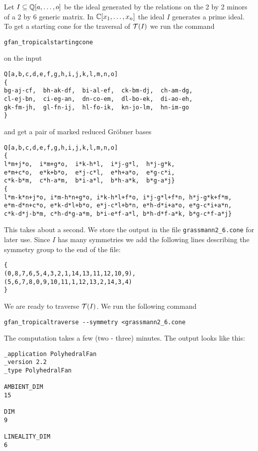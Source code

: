 \begin{example}
Let $I\subseteq\mathbb{Q}[a,\dots,o]$ be the ideal generated by the relations
on the 2 by 2 minors of a 2 by 6 generic matrix.  In $\mathbb{C}[x_1,\dots,x_n]$ the
ideal $I$ generates a prime ideal.  To get a starting cone for the
traversal of $ \mathcal{T} (I)$ we run the command
\begin{verbatim}
gfan_tropicalstartingcone
\end{verbatim}
on the input
\begin{verbatim}
Q[a,b,c,d,e,f,g,h,i,j,k,l,m,n,o]
{
bg-aj-cf,  bh-ak-df,  bi-al-ef,  ck-bm-dj,  ch-am-dg,
cl-ej-bn,  ci-eg-an,  dn-co-em,  dl-bo-ek,  di-ao-eh,
gk-fm-jh,  gl-fn-ij,  hl-fo-ik,  kn-jo-lm,  hn-im-go
}
\end{verbatim}
and get a pair of marked reduced Gr\"obner bases
\begin{verbatim}
Q[a,b,c,d,e,f,g,h,i,j,k,l,m,n,o]
{
l*m+j*o,  i*m+g*o,  i*k-h*l,  i*j-g*l,  h*j-g*k,
e*m+c*o,  e*k+b*o,  e*j-c*l,  e*h+a*o,  e*g-c*i,
c*k-b*m,  c*h-a*m,  b*i-a*l,  b*h-a*k,  b*g-a*j}
{
l*m-k*n+j*o, i*m-h*n+g*o, i*k-h*l+f*o, i*j-g*l+f*n, h*j-g*k+f*m,
e*m-d*n+c*o, e*k-d*l+b*o, e*j-c*l+b*n, e*h-d*i+a*o, e*g-c*i+a*n,
c*k-d*j-b*m, c*h-d*g-a*m, b*i-e*f-a*l, b*h-d*f-a*k, b*g-c*f-a*j}
\end{verbatim}
This takes about a second. We store the output in the file \texttt{grassmann2\_6.cone} for later use. Since $I$ has many symmetries we add the following lines describing the symmetry group to the end of the file:
\begin{verbatim}
{
(0,8,7,6,5,4,3,2,1,14,13,11,12,10,9),
(5,6,7,8,0,9,10,11,1,12,13,2,14,3,4)
}
\end{verbatim}
We are ready to traverse $ \mathcal{T} (I)$.
We run the following command
\begin{verbatim}
gfan_tropicaltraverse --symmetry <grassmann2_6.cone
\end{verbatim}
The computation takes a few (two - three) minutes. The output looks like this:
\begin{verbatim}
_application PolyhedralFan
_version 2.2
_type PolyhedralFan

AMBIENT_DIM
15

DIM
9

LINEALITY_DIM
6


\end{verbatim}
\end{example}
